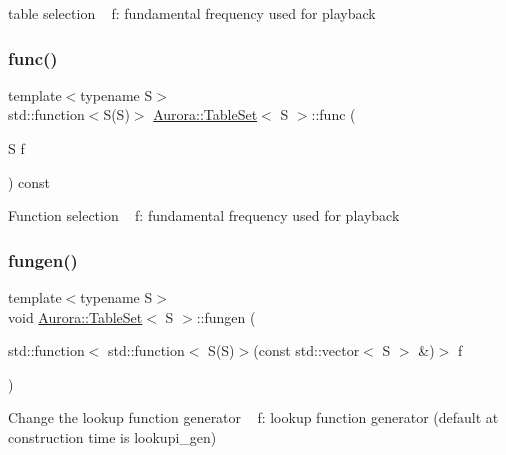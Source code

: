 table selection ~\newline
f\+: fundamental frequency used for playback \mbox{\label{class_aurora_1_1_table_set_a27a325a2c3c4b8cd50e0c86d6ac3c617}} 
\subsubsection{\texorpdfstring{func()}{func()}\hspace{0.1cm}{\footnotesize\ttfamily [2/2]}}
{\footnotesize\ttfamily template$<$typename S$>$ \\
std\+::function$<$S(S)$>$ \hyperlink{class_aurora_1_1_table_set}{Aurora\+::\+Table\+Set}$<$ S $>$\+::func (\begin{DoxyParamCaption}\item[{S}]{f }\end{DoxyParamCaption}) const\hspace{0.3cm}{\ttfamily [inline]}}

Function selection ~\newline
f\+: fundamental frequency used for playback \mbox{\label{class_aurora_1_1_table_set_acd30711601ff6c362253c5d0d9582390}} 
\subsubsection{\texorpdfstring{fungen()}{fungen()}}
{\footnotesize\ttfamily template$<$typename S$>$ \\
void \hyperlink{class_aurora_1_1_table_set}{Aurora\+::\+Table\+Set}$<$ S $>$\+::fungen (\begin{DoxyParamCaption}\item[{std\+::function$<$ std\+::function$<$ S(S)$>$(const std\+::vector$<$ S $>$ \&)$>$}]{f }\end{DoxyParamCaption})\hspace{0.3cm}{\ttfamily [inline]}}

Change the lookup function generator ~\newline
f\+: lookup function generator (default at construction time is lookupi\+\_\+gen) \mbox{\label{class_aurora_1_1_table_set_ac2c945c49d53f60fd909dc771a6ff7e5}} 
